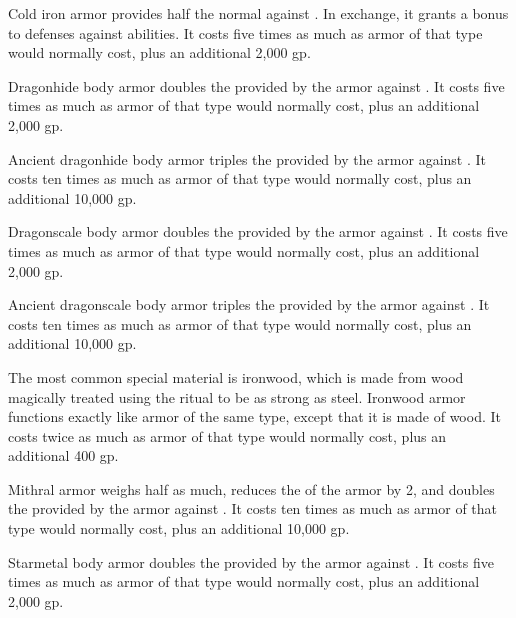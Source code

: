          Cold iron armor provides half the normal  against .
        In exchange, it grants a  bonus to defenses against  abilities.
        It costs five times as much as armor of that type would normally cost, plus an additional 2,000 gp.

         Dragonhide body armor doubles the  provided by the armor against .
        It costs five times as much as armor of that type would normally cost, plus an additional 2,000 gp.

         Ancient dragonhide body armor triples the  provided by the armor against .
        It costs ten times as much as armor of that type would normally cost, plus an additional 10,000 gp.

         Dragonscale body armor doubles the  provided by the armor against .
        It costs five times as much as armor of that type would normally cost, plus an additional 2,000 gp.

         Ancient dragonscale body armor triples the  provided by the armor against .
        It costs ten times as much as armor of that type would normally cost, plus an additional 10,000 gp.

         The most common special material is ironwood, which is made from wood magically treated using the  ritual to be as strong as steel. Ironwood armor functions exactly like  armor of the same type, except that it is made of wood.
        It costs twice as much as armor of that type would normally cost, plus an additional 400 gp.

         Mithral armor weighs half as much, reduces the  of the armor by 2, and doubles the  provided by the armor against .
        It costs ten times as much as armor of that type would normally cost, plus an additional 10,000 gp.

         Starmetal body armor doubles the  provided by the armor against .
        It costs five times as much as armor of that type would normally cost, plus an additional 2,000 gp.


